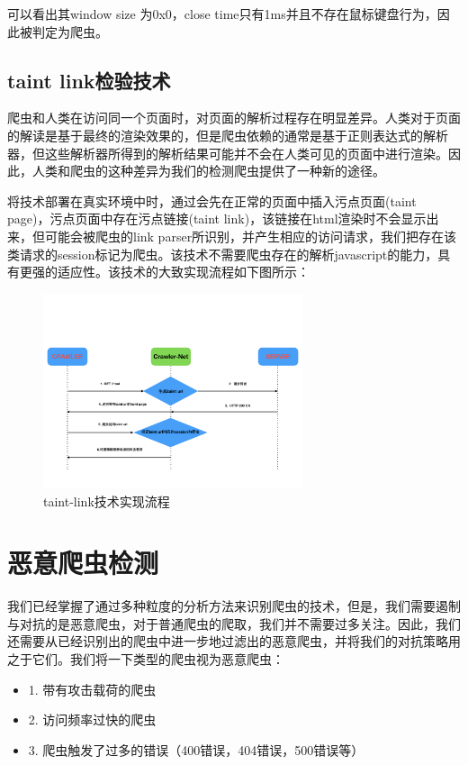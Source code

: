 \documentclass[doctor,privacy,twoside]{buaa_mac}
\begin{document}
可以看出其window size 为0x0，close time只有1ms并且不存在鼠标键盘行为，因此被判定为爬虫。


\subsection{taint link检验技术}
爬虫和人类在访问同一个页面时，对页面的解析过程存在明显差异。人类对于页面的解读是基于最终的渲染效果的，但是爬虫依赖的通常是基于正则表达式的解析器，但这些解析器所得到的解析结果可能并不会在人类可见的页面中进行渲染。因此，人类和爬虫的这种差异为我们的检测爬虫提供了一种新的途径。

将技术部署在真实环境中时，通过会先在正常的页面中插入污点页面(taint page)，污点页面中存在污点链接(taint link)，该链接在html渲染时不会显示出来，但可能会被爬虫的link parser所识别，并产生相应的访问请求，我们把存在该类请求的session标记为爬虫。该技术不需要爬虫存在的解析javascript的能力，具有更强的适应性。该技术的大致实现流程如下图所示：


\centerline{}
\begin{figure}[!h]
  \centering
  \includegraphics[width=0.68\textwidth]{images/taint_link.jpg}
  \caption{taint-link技术实现流程}
  \label{fig:logo}
\end{figure}
\centerline{}


\section{恶意爬虫检测}

我们已经掌握了通过多种粒度的分析方法来识别爬虫的技术，但是，我们需要遏制与对抗的是恶意爬虫，对于普通爬虫的爬取，我们并不需要过多关注。因此，我们还需要从已经识别出的爬虫中进一步地过滤出的恶意爬虫，并将我们的对抗策略用之于它们。我们将一下类型的爬虫视为恶意爬虫：
\begin{itemize}
\item 1. 带有攻击载荷的爬虫
\item 2. 访问频率过快的爬虫
\item 3. 爬虫触发了过多的错误（400错误，404错误，500错误等）
\end{itemize}
\end{document}
